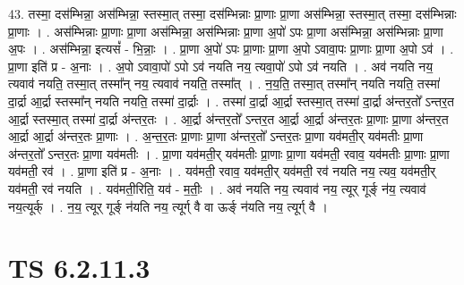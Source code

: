 \documentclass[17pt]{extarticle}
\begin{document}
43. तस्मा॒ दस॑म्भिन्ना॒ अस॑म्भिन्ना॒ स्तस्मा॒त् तस्मा॒ दस॑म्भिन्नाः प्रा॒णाः प्रा॒णा अस॑म्भिन्ना॒ स्तस्मा॒त् तस्मा॒ दस॑म्भिन्नाः प्रा॒णाः । . अस॑म्भिन्नाः प्रा॒णाः प्रा॒णा अस॑म्भिन्ना॒ अस॑म्भिन्नाः प्रा॒णा अ॒पो॑ ऽपः प्रा॒णा अस॑म्भिन्ना॒ अस॑म्भिन्नाः प्रा॒णा अ॒पः । . अस॑म्भिन्ना॒ इत्यसं᳚ - भि॒न्नाः॒ । . प्रा॒णा अ॒पो॑ ऽपः प्रा॒णाः प्रा॒णा अ॒पो ऽवावा॒पः प्रा॒णाः प्रा॒णा अ॒पो ऽव॑ । . प्रा॒णा इति॑ प्र - अ॒नाः । . अ॒पो ऽवावा॒पो॑ ऽपो ऽव॑ नयति नय॒ त्यवा॒पो॑ ऽपो ऽव॑ नयति । . अव॑ नयति नय॒ त्यवाव॑ नयति॒ तस्मा॒त् तस्मा᳚न् नय॒ त्यवाव॑ नयति॒ तस्मा᳚त् । . न॒य॒ति॒ तस्मा॒त् तस्मा᳚न् नयति नयति॒ तस्मा॑ दा॒र्द्रा आ॒र्द्रा स्तस्मा᳚न् नयति नयति॒ तस्मा॑ दा॒र्द्राः । . तस्मा॑ दा॒र्द्रा आ॒र्द्रा स्तस्मा॒त् तस्मा॑ दा॒र्द्रा अ॑न्तर॒तो᳚ ऽन्तर॒त आ॒र्द्रा स्तस्मा॒त् तस्मा॑ दा॒र्द्रा अ॑न्तर॒तः । . आ॒र्द्रा अ॑न्तर॒तो᳚ ऽन्तर॒त आ॒र्द्रा आ॒र्द्रा अ॑न्तर॒तः प्रा॒णाः प्रा॒णा अ॑न्तर॒त आ॒र्द्रा आ॒र्द्रा अ॑न्तर॒तः प्रा॒णाः । . अ॒न्त॒र॒तः प्रा॒णाः प्रा॒णा अ॑न्तर॒तो᳚ ऽन्तर॒तः प्रा॒णा यव॑मती॒र् यव॑मतीः प्रा॒णा अ॑न्तर॒तो᳚ ऽन्तर॒तः प्रा॒णा यव॑मतीः । . प्रा॒णा यव॑मती॒र् यव॑मतीः प्रा॒णाः प्रा॒णा यव॑मती॒ रवाव॒ यव॑मतीः प्रा॒णाः प्रा॒णा यव॑मती॒ रव॑ । . प्रा॒णा इति॑ प्र - अ॒नाः । . यव॑मती॒ रवाव॒ यव॑मती॒र् यव॑मती॒ रव॑ नयति नय॒ त्यव॒ यव॑मती॒र् यव॑मती॒ रव॑ नयति । . यव॑मती॒रिति॒ यव॑ - म॒तीः॒ । . अव॑ नयति नय॒ त्यवाव॑ नय॒ त्यूर् गूर्ङ् न॑य॒ त्यवाव॑ नय॒त्यूर्क् । . न॒य॒ त्यूर् गूर्ङ् न॑यति नय॒ त्यूर्ग् वै वा ऊर्ङ् न॑यति नय॒ त्यूर्ग् वै । \newline
\pagebreak
{}

\section{ TS 6.2.11.3 }
\end{document}
